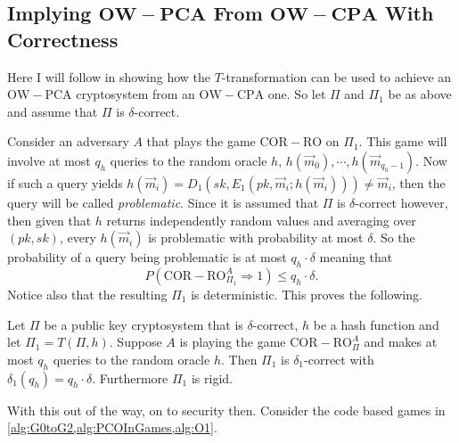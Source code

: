 \subsection{Implying $\mathbf{OW-PCA}$ From $\mathbf{OW-CPA}$ With Correctness}
\label{subsec:ImpPCAFroCPA}

Here I will follow \cite{HHK} in showing how the $T$-transformation can be used to achieve an $\mathrm{OW-PCA}$ cryptosystem from an $\mathrm{OW-CPA}$ one. So let $\Pi$ and $\Pi_1$ be as above and assume that $\Pi$ is $\delta$-correct.

Consider an adversary $A$ that plays the game $\mathrm{COR-RO}$ on $\Pi_1$. This game will involve at most $q_{h}$ queries to the random oracle $h$, $h\left(\vec{m}_0\right), \cdots, h\left(\vec{m}_{q_{h} - 1}\right)$. Now if such a query yields $h\left(\vec{m}_i\right) = D_1\left(sk, E_1\left(pk, \vec{m}_i; h\left(\vec{m}_i\right)\right)\right) \neq \vec{m}_i$, then the query will be called \emph{problematic}. Since it is assumed that $\Pi$ is $\delta$-correct however, then given that $h$ returns independently random values and averaging over $\left(pk, sk\right)$, every $h\left(\vec{m}_i\right)$ is problematic with probability at most $\delta$. So the probability of a query being problematic is at most $q_{h} \cdot \delta$ meaning that
\[
	P\left( \mathrm{COR-RO}^A_{\Pi_1} \Rightarrow 1 \right) \leq q_{h} \cdot \delta.
\]
Notice also that the resulting $\Pi_1$ is deterministic. This proves the following.
\begin{thm}
\label{thm:deltaCorrectnessOfPi1}
	Let $\Pi$ be a public key cryptosystem that is $\delta$-correct, $h$ be a hash function and let $\Pi_1 = T\left(\Pi, h\right)$. Suppose $A$ is playing the game $\mathrm{COR-RO}^A_{\Pi}$ and makes at most $q_h$ queries to the random oracle $h$. Then $\Pi_1$ is $\delta_1$-correct with $\delta_1\left( q_{h} \right) = q_{h} \cdot \delta$. Furthermore $\Pi_1$ is rigid.
\end{thm}

With this out of the way, on to security then. Consider the code based games in \cref{alg:G0toG2,alg:PCOInGames,alg:O1}.

